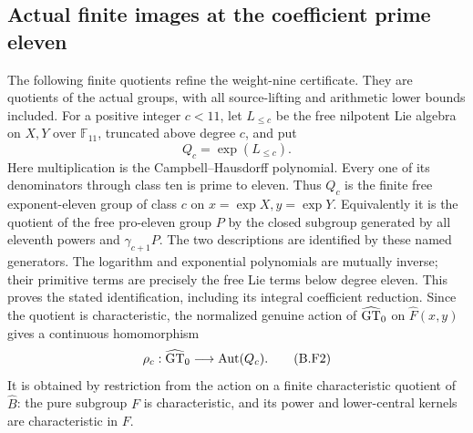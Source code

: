 \subsection{Actual finite images at the coefficient prime eleven}

The following finite quotients refine the weight-nine certificate.
They are quotients of the actual groups, with all source-lifting
and arithmetic lower bounds included. For a positive integer $c<11$,
let $L_{\le c}$ be the free nilpotent Lie algebra on $X,Y$ over
$\mathbb F_{11}$, truncated above degree $c$, and put
\[
 Q_c=\exp(L_{\le c}).                                      \tag{B.F1}
\]
Here multiplication is the Campbell--Hausdorff polynomial. Every
one of its denominators through class ten is prime to eleven.
Thus $Q_c$ is the finite free exponent-eleven group of class $c$
on $x=\exp X,y=\exp Y$. Equivalently it is the quotient of the
free pro-eleven group $P$ by the closed subgroup generated by
all eleventh powers and $\gamma_{c+1}P$. The two descriptions
are identified by these named generators. The logarithm and
exponential polynomials are mutually inverse; their primitive
terms are precisely the free Lie terms below degree eleven.
This proves the stated identification, including its integral
coefficient reduction. Since the quotient is characteristic,
the normalized genuine action of $\widehat{\mathrm{GT}}_0$ on $\widehat F(x,y)$
gives a continuous homomorphism
\[
 \rho_c:\widehat{\mathrm{GT}}_0\longrightarrow\operatorname{Aut}(Q_c).
                                                               \tag{B.F2}
\]
It is obtained by restriction from the action on a finite
characteristic quotient of $\widehat B$: the pure subgroup
$F$ is characteristic, and its power and lower-central kernels
are characteristic in $F$.

